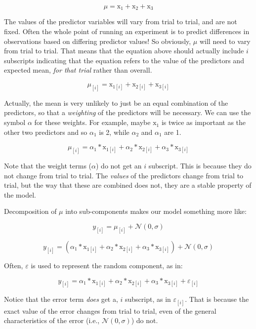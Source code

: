 \documentclass[
]{book}
\begin{document}
\[
\mu = \mathrm{x}_{1} + \mathrm{x}_{2} + \mathrm{x}_{3}
\label{eq:5}
\]

The values of the predictor variables will vary from trial to trial, and are not fixed. Often the whole point of running an experiment is to predict differences in observations based on differing predictor values! So obviously, \(\mu\) will need to vary from trial to trial. That means that the equation above should actually include \(i\) subscripts indicating that the equation refers to the value of the predictors and expected mean, \emph{for that trial} rather than overall.

\[
\mu_{[i]} = \mathrm{x}_{1[i]} + \mathrm{x}_{2[i]} + \mathrm{x}_{3[i]} \label{eq:5}
\]

Actually, the mean is very unlikely to just be an equal combination of the predictors, so that a \emph{weighting} of the predictors will be necessary. We can use the symbol \(\alpha\) for these weights. For example, maybe \(\mathrm{x}_{1}\) is twice as important as the other two predictors and so \(\alpha_1\) is 2, while \(\alpha_2\) and \(\alpha_1\) are 1.

\[
\mu_{[i]} = \alpha_1*\mathrm{x}_{1[i]} + \alpha_2*\mathrm{x}_{2[i]} + \alpha_3*\mathrm{x}_{3[i]}  
\label{eq:6}
\]

Note that the weight terms (\(\alpha\)) do not get an \(i\) subscript. This is because they do not change from trial to trial. The \emph{values} of the predictors change from trial to trial, but the way that these are combined does not, they are a stable property of the model.

Decomposition of \(\mu\) into sub-components makes our model something more like:

\[
y_{[i]} = \mu_{[i]} + \mathcal{N}(0,\sigma)  
\label{eq:7}
\]

\[
y_{[i]} =  (\alpha_1*\mathrm{x}_{1[i]} + \alpha_2*\mathrm{x}_{2[i]} + \alpha_3*\mathrm{x}_{3[i]} ) + \mathcal{N}(0,\sigma)  
\label{eq:8}
\]

Often, \(\varepsilon\) is used to represent the random component, as in:

\[
y_{[i]} = \alpha_1*\mathrm{x}_{1[i]} + \alpha_2*\mathrm{x}_{2[i]} + \alpha_3*\mathrm{x}_{3[i]}+ \varepsilon_{[i]}
\label{eq:9}
\]

Notice that the error term \emph{does} get a, \(i\) subscript, as in \(\varepsilon_{[i]}\). That is because the exact value of the error changes from trial to trial, even of the general characteristics of the error (i.e., \(\mathcal{N}(0,\sigma)\)) do not.
\end{document}
